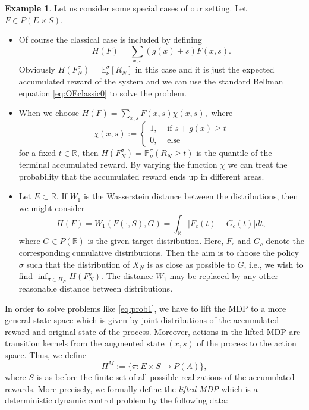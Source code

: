 \documentclass[reqno, 12pt]{amsart}%
\newcommand{\R}{\mathbb{R}} %
\newcommand{\PP}{\mathbb{P}}
\newcommand{\EE}{\mathbb{E}}
\theoremstyle{definition}
\newtheorem{example}[theorem]{Example}
\numberwithin{equation}{section} \numberwithin{theorem}{section}
\begin{document}
\begin{example} \label{exam1}
 Let us consider some special cases of our setting. Let $F\in P(E\times S).$
\begin{itemize}
\item[a)] Of course the classical case is 
included by defining 
$$H(F)=\sum_{x,s} (g(x)+s) F(x,s).$$
Obviously $H(F_N^\sigma)= \EE_\nu^\sigma[R_N] $ in 
this case and it is just the expected accumulated 
reward of the system and we can use the standard 
Bellman equation \eqref{eq:OEclassic0} to solve the 
problem.
\item[b)] When we choose 
$H(F)=  \sum_{x,s} F(x,s) \chi(x,s),$ where
 $$ \chi(x,s):= \left\{ \begin{array}{cl}
    1 , & \mbox{ if } s+g(x)\ge t  \\
    0 , & \mbox{ else }
 \end{array}\right.$$ for a fixed $t\in\R$, then  $H(F_N^\sigma)= \PP^\sigma_\nu(R_{N}\ge t) $ is the quantile of the terminal accumulated reward. By varying the function $\chi$ we can treat the probability that the accumulated reward ends up in different areas.
\item[c)]   Let $E\subset \R$. If $W_1$ is the Wasserstein distance between the distributions, then we might consider
$$H(F) = W_1(F(\cdot,S),G)=  \int_{\R} |F_c(t)-G_c(t)|dt,$$
where $G\in P(\R)$ is the given target distribution. Here, $F_c$ and $G_c$ denote the corresponding cumulative distributions.
Then the aim is to choose the policy 
$\sigma$ such that the distribution of $X_N$ is as 
close as possible to  
$G$, i.e., we wish to find $\inf_{\sigma\in\Pi_N} H(F^\sigma_N).$ The distance $W_1$ may be replaced by any other reasonable distance between distributions. 
\end{itemize}
\end{example}


\noindent 
In order to solve problems like \eqref{eq:prob1}, we have to lift the MDP to a more general state space which is given by joint distributions of the accumulated reward and original state of the process. Moreover, actions in the lifted MDP are transition kernels from the augmented state $(x,s)$ of the process to the action space.  Thus, we define
$$ \Pi^M := \{ \pi : E\times S \to P(A) \},$$
where $S$ is as before the finite set of all possible realizations of the accumulated rewards.
More precisely, we formally define the {\em lifted MDP} which is a deterministic dynamic control problem by the following data:
\end{document}
